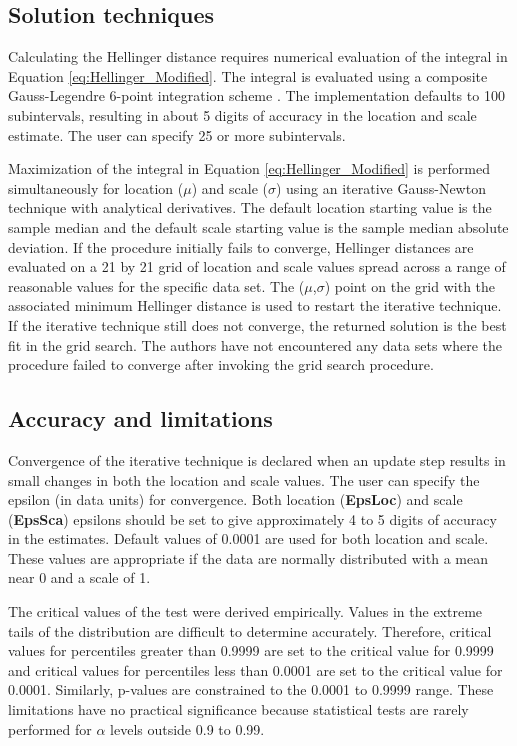 \documentclass{article}
\begin{document}
\subsection{Solution techniques}

Calculating the Hellinger distance requires numerical evaluation of the integral in Equation \ref{eq:Hellinger_Modified}.  The integral is evaluated using a composite Gauss-Legendre 6-point integration scheme \parencite{beyer1987}.  The implementation defaults to 100 subintervals, resulting in about 5 digits of accuracy in the location and scale estimate.  The user can specify 25 or more subintervals.

Maximization of the integral in Equation \ref{eq:Hellinger_Modified} is performed simultaneously for location ($\mu$) and scale ($\sigma$) using an iterative Gauss-Newton technique with analytical derivatives.  The default location starting value is the sample median and the default scale starting value is the sample median absolute deviation.  If the procedure initially fails to converge, Hellinger distances are evaluated on a 21 by 21 grid of location and scale values spread across a range of reasonable values for the specific data set.  The ($\mu$,$\sigma$) point on the grid with the associated minimum Hellinger distance is used to restart the iterative technique.  If the iterative technique still does not converge, the returned solution is the best fit in the grid search.  The authors have not encountered any data sets where the procedure failed to converge after invoking the grid search procedure.

\subsection{Accuracy and limitations}
Convergence of the iterative technique is declared when an update step results in small changes in both the location and scale values.  The user can specify the epsilon (in data units) for convergence.  Both location (\textbf{EpsLoc}) and scale (\textbf{EpsSca}) epsilons should be set to give approximately 4 to 5 digits of accuracy in the estimates.  Default values of 0.0001 are used for both location and scale.  These values are appropriate if the data are normally distributed with a mean near 0 and a scale of 1.

The critical values of the test were derived empirically.  Values in the extreme tails of the distribution are difficult to determine accurately.  Therefore, critical values for percentiles greater than 0.9999 are set to the critical value for 0.9999 and critical values for percentiles less than 0.0001 are set to the critical value for 0.0001.  Similarly, p-values are constrained to the 0.0001 to 0.9999 range.  These limitations have no practical significance because statistical tests are rarely performed for $\alpha$ levels outside 0.9 to 0.99.
\end{document}

